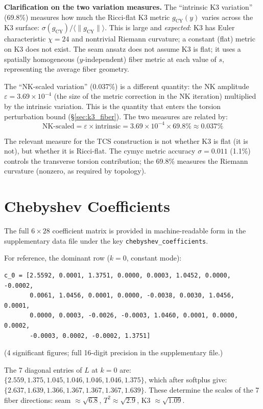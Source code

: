 \documentclass[11pt,a4paper]{article}
\newcommand{\norm}[1]{\|#1\|}
\theoremstyle{remark}
\begin{document}
\textbf{Clarification on the two variation measures.} The ``intrinsic K3 variation'' (69.8\%)
measures how much the Ricci-flat K3 metric $g_{\mathrm{CY}}(y)$ varies across the K3 surface:
$\sigma(g_{\mathrm{CY}})/\langle\norm{g_{\mathrm{CY}}}\rangle$. This is large and \textit{expected}: K3 has Euler characteristic $\chi = 24$
and nontrivial Riemann curvature; a constant (flat) metric on K3 does not exist.
The seam ansatz does not assume K3 is flat; it uses a spatially homogeneous
($y$-independent) fiber metric at each value of $s$, representing the average fiber
geometry.

The ``NK-scaled variation'' (0.037\%) is a different quantity: the NK amplitude
$\varepsilon = 3.69 \times 10^{-4}$ (the size of the metric correction in the NK iteration) multiplied
by the intrinsic variation. This is the quantity that enters the torsion perturbation
bound (\S\ref{sec:k3_fiber}). The two measures are related by:
\[
\text{NK-scaled} = \varepsilon \times \text{intrinsic} = 3.69 \times 10^{-4} \times 69.8\% \approx 0.037\%
\]

The relevant measure for the TCS construction is not whether K3 is flat (it is not),
but whether it is Ricci-flat. The cymyc metric accuracy $\sigma = 0.011$ (1.1\%) controls
the transverse torsion contribution; the 69.8\% measures the Riemann curvature
(nonzero, as required by topology).

\section{Chebyshev Coefficients}\label{app:cheb}

The full $6 \times 28$ coefficient matrix is provided in machine-readable form in the
supplementary data file under the key \texttt{chebyshev\_coefficients}.

For reference, the dominant row ($k = 0$, constant mode):

\begin{lstlisting}
c_0 = [2.5592, 0.0001, 1.3751, 0.0000, 0.0003, 1.0452, 0.0000, -0.0002,
       0.0061, 1.0456, 0.0001, 0.0000, -0.0038, 0.0030, 1.0456, 0.0001,
       0.0000, 0.0003, -0.0026, -0.0003, 1.0460, 0.0001, 0.0000, 0.0002,
       -0.0003, 0.0002, -0.0002, 1.3751]
\end{lstlisting}

(4 significant figures; full 16-digit precision in the supplementary file.)

The 7 diagonal entries of $L$ at $k = 0$ are: $\{2.559, 1.375, 1.045, 1.046, 1.046, 1.046, 1.375\}$,
which after softplus give: $\{2.637, 1.639, 1.366, 1.367, 1.367, 1.367, 1.639\}$. These determine
the scales of the 7 fiber directions: seam $\approx \sqrt{6.8}$, $T^2 \approx \sqrt{2.9}$, K3 $\approx \sqrt{1.09}$.
\end{document}
